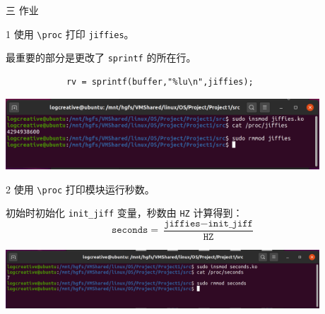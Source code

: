 \documentclass[12pt,a4paper]{article}
\newenvironment{problems}{\begin{list}{}{\renewcommand{\makelabel}[1]{\textbf{##1}\hfil}}}{\end{list}}
\newenvironment{steps}{\begin{list}{}{\renewcommand{\makelabel}[1]{##1.\hfil}}}{\end{list}}
\providecommand{\code}[2]{}
\begin{document}
\begin{problems}
    \item[三] 作业
    \begin{steps}
        \item[1] 使用 \verb"\proc" 打印 \texttt{jiffies}。
        
        最重要的部分是更改了 \verb"sprintf" 的所在行。
        \begin{lstlisting}
            rv = sprintf(buffer,"%lu\n",jiffies);    
        \end{lstlisting}

        \includegraphics[width=0.88\textwidth]{jiffiesh.png}
        
        \code{src/jiffies.c}{c}

        \item[2] 使用 \verb"\proc" 打印模块运行秒数。
        
        初始时初始化 \verb"init_jiff" 变量，秒数由 \verb"HZ" 计算得到：
        \begin{equation*}
            \texttt{seconds} = \frac{\texttt{jiffies}-\texttt{init\_jiff}}{\texttt{HZ}}
        \end{equation*}
        
        \includegraphics[width=0.88\textwidth]{seconds.png}

        \code{src/seconds.c}{c}
    \end{steps}

\end{problems}
\end{document}
